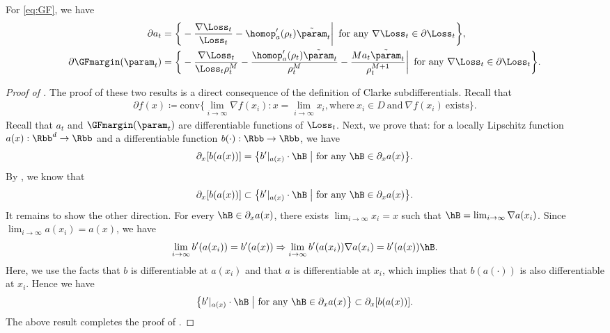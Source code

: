 \begin{lemma}
\label{lem:subdifferential of GFmargin}
For \eqref{eq:GF}, we have 
\begin{align*}
\partial a_t
&= \bigg \{- \frac{ \nabla \Loss_t}{\Loss_t } - {\homop_a^\prime (\rho_t) \tilde \param_t}  \bigg | \, \text{ for any } \nabla \Loss_t \in \partial \Loss_t  \bigg\},
\\
\partial \GFmargin(\param_t) 
&= \bigg \{- \frac{ \nabla \Loss_t}{\Loss_t \rho_t^M} - \frac{\homop_a^\prime (\rho_t) \tilde \param_t}{\rho_t^M} - \frac{Ma_t \tilde \param_t}{\rho_t^{M+1}} \bigg | \,  \text{ for any }  \nabla \Loss_t \in \partial \Loss_t  \bigg\}. 
\end{align*}
\end{lemma}
\begin{proof}[Proof of ]
The proof of these two results is a direct consequence of the definition of Clarke subdifferentials. Recall that 
\[
\begin{aligned}
\partial f(x) \coloneqq \text{conv} \bigg\{ 
 \lim_{i\to \infty} \nabla f(x_i) : x= \lim_{i\to \infty} x_i, 
\text{where}\ x_i \in D \ \text{and}\ \nabla f(x_i) \ \text{exists}
  \bigg\}.
\end{aligned}
\]
Recall that $a_t$ and $\GFmargin(\param_t)$ are differentiable functions of $\Loss_t$. 
Next, we prove that:
for a locally Lipschitz function $a(x):\Rbb^d \to \Rbb$ and a differentiable function $b(\cdot):\Rbb \to \Rbb$, we have 
\[
\partial_x [b(a(x))] = \big \{ b^\prime|_{a(x)} \cdot \hB \; \big | \text{ for any } \hB \in \partial_x a(x) \big \}.
\]
By ,  we know that 
\[
\partial_x [b(a(x))] \subset \big \{ b^\prime|_{a(x)} \cdot \hB \; \big | \text{ for any } \hB \in \partial_x a(x) \big \}. 
\]
It remains to show the other direction. 
For every $\hB \in \partial_x a(x)$, there exists $\lim_{i\to \infty} x_i = x$ such that $\hB  = \lim_{i\to \infty} \nabla a(x_i)$. Since $\lim_{i \to \infty} a(x_i) = a(x)$, we have 
\[
 \lim_{i \to \infty}  b^\prime (a(x_i)) = b^\prime (a(x)) \Rightarrow \lim_{i \to \infty}  b^\prime (a(x_i)) \nabla a(x_i) = b^\prime (a(x)) \hB.
\] 
Here, we use the facts that $b$ is differentiable at $a(x_i)$ and that $a$ is differentiable at $x_i$, which  
implies that $b(a(\cdot))$ is also differentiable at $x_i$. Hence we have 
\[
\big \{ b^\prime|_{a(x)} \cdot \hB \; \big | \text{ for any } \hB \in \partial_x a(x) \big \} \subset\partial_x [b(a(x))].
\]
The above result completes the proof of .
\end{proof}

